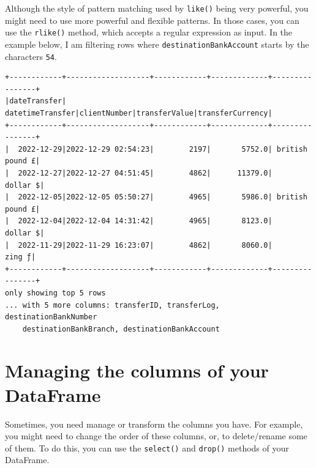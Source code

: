 \documentclass[
  11pt,
  letterpaper,
  DIV=11,
  numbers=noendperiod]{scrreprt}
\newenvironment{Shaded}{\begin{snugshade}}{\end{snugshade}}
\newcommand{\DecValTok}[1]{\textcolor[rgb]{0.68,0.00,0.00}{#1}}
\newcommand{\NormalTok}[1]{\textcolor[rgb]{0.00,0.23,0.31}{#1}}
\newcommand{\OperatorTok}[1]{\textcolor[rgb]{0.37,0.37,0.37}{#1}}
\newcommand{\SpecialCharTok}[1]{\textcolor[rgb]{0.37,0.37,0.37}{#1}}
\newcommand{\StringTok}[1]{\textcolor[rgb]{0.13,0.47,0.30}{#1}}
\begin{document}
Although the style of pattern matching used by \texttt{like()} being
very powerful, you might need to use more powerful and flexible
patterns. In those cases, you can use the \texttt{rlike()} method, which
accepts a regular expression as input. In the example below, I am
filtering rows where \texttt{destinationBankAccount} starts by the
characters \texttt{54}.

\begin{Shaded}
\end{Shaded}

\begin{verbatim}
+------------+-------------------+------------+-------------+----------------+
|dateTransfer|   datetimeTransfer|clientNumber|transferValue|transferCurrency|
+------------+-------------------+------------+-------------+----------------+
|  2022-12-29|2022-12-29 02:54:23|        2197|       5752.0| british pound £|
|  2022-12-27|2022-12-27 04:51:45|        4862|      11379.0|        dollar $|
|  2022-12-05|2022-12-05 05:50:27|        4965|       5986.0| british pound £|
|  2022-12-04|2022-12-04 14:31:42|        4965|       8123.0|        dollar $|
|  2022-11-29|2022-11-29 16:23:07|        4862|       8060.0|          zing ƒ|
+------------+-------------------+------------+-------------+----------------+
only showing top 5 rows
... with 5 more columns: transferID, transferLog, destinationBankNumber
    destinationBankBranch, destinationBankAccount
\end{verbatim}

\hypertarget{managing-the-columns-of-your-dataframe}{%
\section{Managing the columns of your
DataFrame}\label{managing-the-columns-of-your-dataframe}}

Sometimes, you need manage or transform the columns you have. For
example, you might need to change the order of these columns, or, to
delete/rename some of them. To do this, you can use the
\texttt{select()} and \texttt{drop()} methods of your DataFrame.
\end{document}
